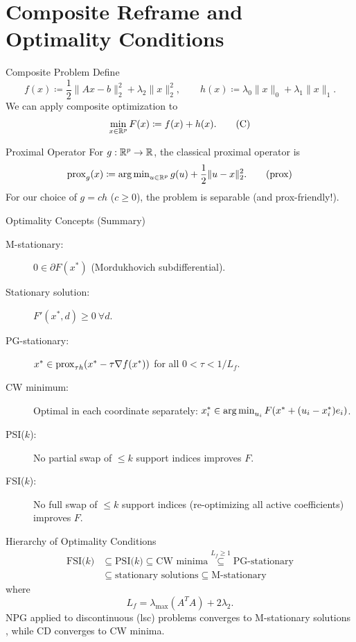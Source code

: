 \section{Composite Reframe and Optimality Conditions}

\begin{frame}{Composite Problem}
Define
\[
f(x) \coloneqq \frac{1}{2} \|Ax-b\|_2^2 + \lambda_2 \|x\|_2^2,\qquad
h(x) \coloneqq \lambda_0 \|x\|_0 + \lambda_1 \|x\|_1.
\]
We can apply composite optimization to
\[
\min_{x \in \mathbb{R}^p} F(x) \coloneqq f(x) + h(x). \tag{C}\label{C}
\]
\end{frame}

\begin{frame}{Proximal Operator}
For $g:\mathbb{R}^p \to \mathbb{R}$, the classical proximal operator is
\[
\operatorname{prox}_{g}(x) \coloneqq \operatorname{arg\,min}_{u \in \mathbb{R}^p} g(u) + \frac{1}{2}\|u-x\|_2^2. \tag{prox}\label{prox}
\]
For our choice of $g = c h$ ($c \ge 0$), the problem is separable (and prox-friendly!).
\end{frame}

\begin{frame}{Optimality Concepts (Summary)}
\begin{description}
\item[\alert{M-stationary}:] $0 \in \partial F(x^*)$ (Mordukhovich subdifferential).
\item[\alert{Stationary solution}:] $F'(x^*,d) \ge 0\ \forall d$. 
\item[\alert{PG-stationary}:] $x^* \in \operatorname{prox}_{\tau h}(x^* - \tau\nabla f(x^*))$ for all $0<\tau<1/L_f$.
\item[\alert{CW minimum}:] Optimal in each coordinate separately: $x_i^*\in\operatorname{arg\,min}_{u_i} F(x^*+(u_i-x_i^*)e_i)$.
\item[\alert{PSI($k$)}:] No partial swap of $\le k$ support indices improves $F$.
\item[\alert{FSI($k$)}:] No full swap of $\le k$ support indices (re-optimizing all active coefficients) improves $F$.
\end{description}
\end{frame}

\begin{frame}{Hierarchy of Optimality Conditions}
\[
\begin{aligned}
\text{FSI($k$)} &\subseteq \text{PSI($k$)} \subseteq \text{CW minima} \overset{L_f\ge 1}{\subseteq} \text{PG-stationary}\\
&\subseteq \text{stationary solutions} \subseteq \text{M-stationary}
\end{aligned}
\]
where
\[
L_f = \lambda_{\max}(A^T A) + 2\lambda_2.
\]
\newline
NPG applied to discontinuous (lsc) problems converges to M-stationary solutions \cite{kanzow2021}, while CD converges to CW minima.
\end{frame}